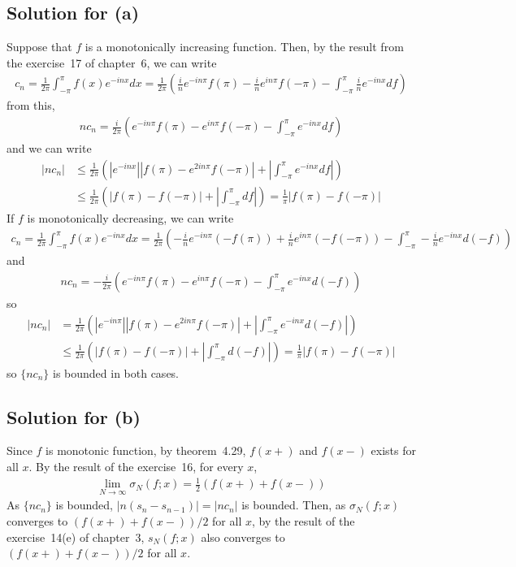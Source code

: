 \documentclass{scrartcl}
\begin{document}
\subsection{Solution for (a)}
Suppose that \(f\) is a monotonically increasing function. Then, by the result
from the exercise~17 of chapter~6, we can write
\begin{align*}
  c_n
  = \frac{1}{2\pi} \int^\pi_{-\pi} f(x) e^{-inx} dx
  = \frac{1}{2\pi} \left( \frac{i}{n} e^{-in\pi} f(\pi)
    - \frac{i}{n} e^{in\pi} f(-\pi)
    - \int^\pi_{-\pi} \frac{i}{n} e^{-inx} df \right)
\end{align*}
from this,
\begin{align*}
  nc_n
  = \frac{i}{2\pi} \left( e^{-in\pi} f(\pi) - e^{in\pi} f(-\pi)
    - \int^\pi_{-\pi} e^{-inx} df \right)
\end{align*}
and we can write
\begin{align*}
  |nc_n|
  &\le \frac{1}{2\pi} \left( |e^{-inx}| |f(\pi) - e^{2in\pi} f(-\pi)|
    + \left| \int^\pi_{-\pi} e^{-inx} df \right| \right) \\
  &\le \frac{1}{2\pi} \left( |f(\pi) - f(-\pi)|
    + \left| \int^\pi_{-\pi} df \right| \right)
  = \frac{1}{\pi} |f(\pi) - f(-\pi)|
\end{align*}
If \(f\) is monotonically decreasing, we can write
\begin{align*}
  c_n
  = \frac{1}{2\pi} \int^\pi_{-\pi} f(x) e^{-inx} dx
  = \frac{1}{2\pi} \left( -\frac{i}{n} e^{-in\pi} (-f(\pi))
    + \frac{i}{n} e^{in\pi} (-f(-\pi))
    - \int^\pi_{-\pi} -\frac{i}{n} e^{-inx} d(-f) \right)
\end{align*}
and
\begin{align*}
  nc_n
  = -\frac{i}{2\pi} \left( e^{-in\pi} f(\pi) - e^{in\pi} f(-\pi)
    - \int^\pi_{-\pi} e^{-inx} d(-f) \right)
\end{align*}
so
\begin{align*}
  |nc_n|
  &= \frac{1}{2\pi} \left( |e^{-in\pi}| |f(\pi) - e^{2in\pi} f(-\pi)|
    + \left| \int^\pi_{-\pi} e^{-inx} d(-f) \right| \right) \\
  &\le \frac{1}{2\pi} \left( |f(\pi) - f(-\pi)|
    + \left| \int^\pi_{-\pi} d(-f) \right| \right)
  = \frac{1}{\pi} |f(\pi) - f(-\pi)|
\end{align*}
so \(\{nc_n\}\) is bounded in both cases.

\subsection{Solution for (b)}
Since \(f\) is monotonic function, by theorem~4.29, \(f(x+)\) and \(f(x-)\)
exists for all \(x\). By the result of the exercise~16, for every \(x\),
\begin{align*}
  \lim_{N \to \infty} \sigma_N(f; x)
  = \frac{1}{2} (f(x+) + f(x-))
\end{align*}
As \(\{nc_n\}\) is bounded, \(|n(s_n - s_{n - 1})| = |nc_n|\) is bounded. Then,
as \(\sigma_N(f; x)\) converges to \((f(x+) + f(x-)) / 2\) for all \(x\), by
the result of the exercise~14(e) of chapter~3, \(s_N(f; x)\) also converges to
\((f(x+) + f(x-)) / 2\) for all \(x\).
\end{document}
